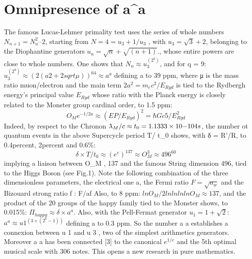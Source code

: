 \section {Omnipresence of a^a}

The famous Lucas-Lehmer primality test uses the series of whole numbers $N_{n+1} = N_{n}^{2} – 2$,
starting from $N = 4 = u_{3} + 1/u_{3}$ , with $u_{3} = \sqrt{3} + 2$, belonging to the Diophantine generators $u_{n} = \sqrt{n} +
\sqrt{(n+1)}$., whose entire powers are close to whole numbers. One shows that $N_{n} \approx u_{3}^{(2^{q})}$, and for q
= 9:
$u_{3}^(2^9) \approx (2(a2 + 2sqrt{\mu}))^{64} \approx a^{a}$
defining a to 39 ppm, where μ is the mass ratio muon/electron and the main term $2a^{2} = m_{e} c^{2}/E_{Ryd}$ is
tied to the Rydbergh energy's principal value $E_{Ryd}$ whose ratio with the Planck energy is closely
related to the Monster group cardinal order, to 1.5 ppm:
$$O_{M} e^{-1/2a} \approx (E P /E_{Ryd})^{2} = \hbar Gc 5 /E_{Ryd}^2$$
Indeed, by respect to the Chronon $\lambdabar_M /c \approx t_0 = 1.1333 \times 10{-104} s$, the number ot quantum events in
the above Supercycle period T/ t_0 shows, with δ = R'/R, to 0.4{percent}, 2{percent} and 0.6\%:
$$\delta \times T/t_{0} \approx (e^{e} )^{137} \approx O_{M}^{3} \approx 496^{60}$$
implying a liaison between O_{M} , 137 and the famous String dimension 496, tied to the Higgs Boson
(see Fig.1). Note the following combination of the three dimensionless parameters, the electrical
one a, the Fermi ratio $F =\sqrt{a_{w}}$ and the Bizouard strong ratio f :
F/af 
Also, to 8 ppm: $lnO_{M} /2lnlnlnlnO_{M} \approx 137$, and the product of the 20 groups of the happy family tied
to the Monster shows, to 0.015\%:
$\Pi_{happy} \approx \delta \times a^{a}$. Also, with the Pell-Fermat generator $u_{1} = 1 + \sqrt{2}$:
$a^{a} \approx u 1^(3\times(2^{8} - 1))$
defining a to 0.3 ppm. So the number a a establishes a connexion between u 1 and u 3 , two of the
simplest arithmetics generators. Moreover a a has been connected [3] to the canonical $e^{1/e}$ and the
5{th} optimal musical scale with 306 notes. This opens a new research in pure mathematics.


